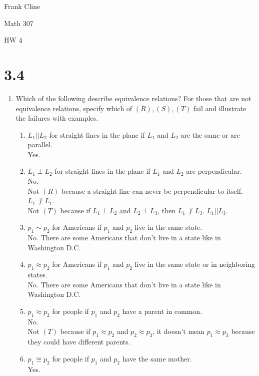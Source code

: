 \documentclass[11pt]{article}
\begin{document}
\onehalfspacing
\hfill Frank Cline

\hfill Math 307

\hfill HW 4


\section*{3.4}
\begin{enumerate}
\item Which of the following describe equivalence relations? For those that are not equivalence relations, specify which of $(R),(S),(T)$ fail and illustrate the failures with examples.
	\begin{enumerate}
	\item $L_1||L_2$ for straight lines in the plane if $L_1$ and $L_2$ are the same or are parallel.\\
	Yes.
	\item $L_1\perp L_2$ for straight lines in the plane if $L_1$ and $L_2$ are perpendicular.\\
	No.\\
	Not $(R)$ because a straight line can never be perpendicular to itself. $L_1\not\perp L_1$.\\
	Not $(T)$ because if $L_1\perp L_2$ and $L_2\perp L_3$, then $L_1\not\perp L_3$. $L_1||L_3$.
	\item $p_1\sim p_2$ for Americans if $p_1$ and $p_2$ live in the same state.\\
	No. There are some Americans that don't live in a state like in Washington D.C.
	\item $p_1\approx p_2$ for Americans if $p_1$ and $p_2$ live in the same state or in neighboring 
	states.\\
	No. There are some Americans that don't live in a state like in Washington D.C.
	\item $p_1\approx p_2$ for people if $p_1$ and $p_2$ have a parent in common.\\
	No.\\
	Not $(T)$ because if $p_1\approx p_2$ and $p_2\approx p_3$, it doesn't mean $p_1\approx p_3$ because they could have 
	different parents.
	\item $p_1\cong p_2$ for people if $p_1$ and $p_2$ have the same mother.\\
	Yes.
	\end{enumerate}

\end{enumerate}
\end{document}
